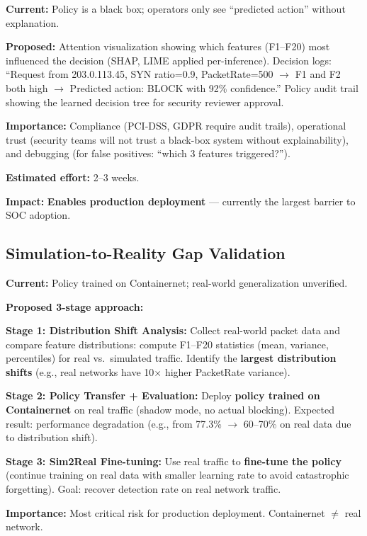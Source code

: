\documentclass[12pt,a4paper]{report}
\begin{document}
\textbf{Current:} Policy is a black box; operators only see ``predicted action'' without explanation.

\textbf{Proposed:} Attention visualization showing which features (F1--F20) most influenced the decision (SHAP, LIME applied per-inference). Decision logs: ``Request from 203.0.113.45, SYN ratio=0.9, PacketRate=500 $\to$ F1 and F2 both high $\to$ Predicted action: BLOCK with 92\% confidence.'' Policy audit trail showing the learned decision tree for security reviewer approval.

\textbf{Importance:} Compliance (PCI-DSS, GDPR require audit trails), operational trust (security teams will not trust a black-box system without explainability), and debugging (for false positives: ``which 3 features triggered?'').

\textbf{Estimated effort:} 2--3 weeks.

\textbf{Impact:} \textbf{Enables production deployment} --- currently the largest barrier to SOC adoption.

\subsection{Simulation-to-Reality Gap Validation}

\textbf{Current:} Policy trained on Containernet; real-world generalization unverified.

\textbf{Proposed 3-stage approach:}

\textbf{Stage 1: Distribution Shift Analysis:} Collect real-world packet data and compare feature distributions: compute F1--F20 statistics (mean, variance, percentiles) for real vs.\ simulated traffic. Identify the \textbf{largest distribution shifts} (e.g., real networks have 10$\times$ higher PacketRate variance).

\textbf{Stage 2: Policy Transfer + Evaluation:} Deploy \textbf{policy trained on Containernet} on real traffic (shadow mode, no actual blocking). Expected result: performance degradation (e.g., from 77.3\% $\to$ 60--70\% on real data due to distribution shift).

\textbf{Stage 3: Sim2Real Fine-tuning:} Use real traffic to \textbf{fine-tune the policy} (continue training on real data with smaller learning rate to avoid catastrophic forgetting). Goal: recover detection rate on real network traffic.

\textbf{Importance:} Most critical risk for production deployment. Containernet $\neq$ real network.
\end{document}
